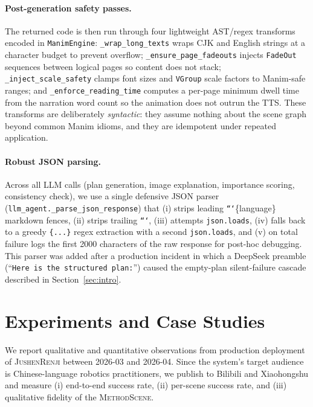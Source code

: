 \documentclass[11pt,a4paper]{article}
\begin{document}
\paragraph{Post-generation safety passes.}
The returned code is then run through four lightweight AST/regex transforms encoded in \texttt{ManimEngine}: \texttt{\_wrap\_long\_texts} wraps CJK and English strings at a character budget to prevent overflow; \texttt{\_ensure\_page\_fadeouts} injects \texttt{FadeOut} sequences between logical pages so content does not stack; \texttt{\_inject\_scale\_safety} clamps font sizes and \texttt{VGroup} scale factors to Manim-safe ranges; and \texttt{\_enforce\_reading\_time} computes a per-page minimum dwell time from the narration word count so the animation does not outrun the TTS. These transforms are deliberately \emph{syntactic}: they assume nothing about the scene graph beyond common Manim idioms, and they are idempotent under repeated application.

\paragraph{Robust JSON parsing.}
Across all LLM calls (plan generation, image explanation, importance scoring, consistency check), we use a single defensive JSON parser (\texttt{llm\_agent.\_parse\_json\_response}) that (i) strips leading \texttt{```}\{language\} markdown fences, (ii) strips trailing \texttt{```}, (iii) attempts \texttt{json.loads}, (iv) falls back to a greedy \texttt{\{...\}} regex extraction with a second \texttt{json.loads}, and (v) on total failure logs the first 2000 characters of the raw response for post-hoc debugging. This parser was added after a production incident in which a DeepSeek preamble (``\texttt{Here is the structured plan:}'') caused the empty-plan silent-failure cascade described in Section~\ref{sec:intro}.

\section{Experiments and Case Studies}
\label{sec:experiments}

We report qualitative and quantitative observations from production deployment of \textsc{JushenRenji} between 2026-03 and 2026-04. Since the system's target audience is Chinese-language robotics practitioners, we publish to Bilibili and Xiaohongshu and measure (i) end-to-end success rate, (ii) per-scene success rate, and (iii) qualitative fidelity of the \textsc{MethodScene}.
\end{document}
